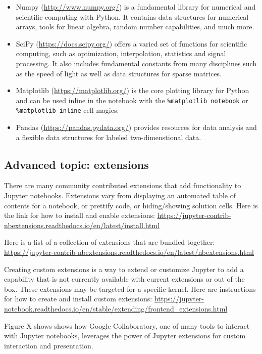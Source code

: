 \documentclass[]{book}
\providecommand{\tightlist}{%
  \setlength{\itemsep}{0pt}\setlength{\parskip}{0pt}}
\begin{document}
\begin{itemize}
\tightlist
\item
  Numpy (\url{http://www.numpy.org/}) is a fundamental library for
  numerical and scientific computing with Python. It contains data
  structures for numerical arrays, tools for linear algebra, random
  number capabilities, and much more.
\item
  SciPy (\href{https://docs.scipy.rg/}{https://docs.scipy.org/}) offers
  a varied set of functions for scientific computing, such as
  optimization, interpolation, statistics and signal processing. It also
  includes fundamental constants from many disciplines such as the speed
  of light as well as data structures for sparse matrices.
\item
  Matplotlib (\url{https://matplotlib.org/}) is the core plotting
  library for Python and can be used inline in the notebook with the
  \texttt{\%matplotlib\ notebook} or \texttt{\%matplotlib\ inline} cell
  magics.
\item
  Pandas (\url{https://pandas.pydata.org/}) provides resources for data
  analysis and a flexible data structures for labeled two-dimenstional
  data.
\end{itemize}

\subsection{Advanced topic: extensions}\label{advanced-topic-extensions}

There are many community contributed extensions that add functionality
to Jupyter notebooks. Extensions vary from displaying an automated table
of contents for a notebook, or prettify code, or hiding/showing solution
cells. Here is the link for how to install and enable extensions:
\url{https://jupyter-contrib-nbextensions.readthedocs.io/en/latest/install.html}

Here is a list of a collection of extensions that are bundled together:
\url{https://jupyter-contrib-nbextensions.readthedocs.io/en/latest/nbextensions.html}

Creating custom extensions is a way to extend or customize Jupyter to
add a capability that is not currently available with current extensions
or out of the box. These extensions may be targeted for a specific
kernel. Here are instructions for how to create and install custom
extensions:
\url{https://jupyter-notebook.readthedocs.io/en/stable/extending/frontend_extensions.html}

Figure X shows shows how Google Collaboratory, one of many tools to
interact with Jupyter notebooks, leverages the power of Jupyter
extensions for custom interaction and presentation.
\end{document}
